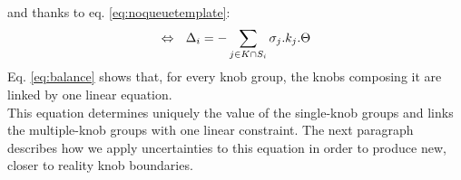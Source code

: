 \\ 
and thanks to eq. \ref{eq:noqueuetemplate}:
\begin{equation}
\centering
\label{eq:balance}
\Leftrightarrow\ \ \Delta_{i}=-\sum\limits_{j\in K\cap S_{i}}\sigma_{j}.k_{j}.\Theta
\end{equation}
Eq. \ref{eq:balance} shows that, for every knob group, the knobs composing it are linked by one linear equation.\\
This equation determines uniquely the value of the single-knob groups and links the multiple-knob groups with one linear constraint. The next paragraph describes how we apply uncertainties to this equation in order to produce new, closer to reality knob boundaries.\\

